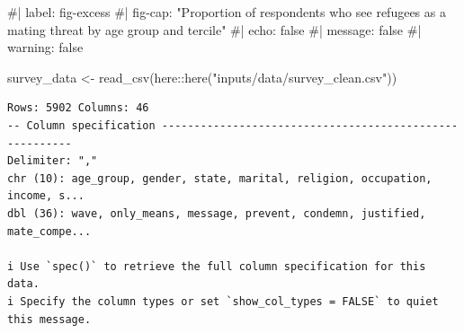 \documentclass[
]{article}
\newenvironment{Shaded}{\begin{snugshade}}{\end{snugshade}}
\newcommand{\CommentTok}[1]{\textcolor[rgb]{0.37,0.37,0.37}{#1}}
\newcommand{\FunctionTok}[1]{\textcolor[rgb]{0.28,0.35,0.67}{#1}}
\newcommand{\NormalTok}[1]{\textcolor[rgb]{0.00,0.23,0.31}{#1}}
\newcommand{\OtherTok}[1]{\textcolor[rgb]{0.00,0.23,0.31}{#1}}
\newcommand{\SpecialCharTok}[1]{\textcolor[rgb]{0.37,0.37,0.37}{#1}}
\newcommand{\StringTok}[1]{\textcolor[rgb]{0.13,0.47,0.30}{#1}}
\begin{document}
\begin{Shaded}
\begin{Highlighting}[]
\CommentTok{\#| label: fig{-}excess}
\CommentTok{\#| fig{-}cap: "Proportion of respondents who see refugees as a mating threat by age group and tercile"}
\CommentTok{\#| echo: false}
\CommentTok{\#| message: false}
\CommentTok{\#| warning: false}

\NormalTok{survey\_data }\OtherTok{\textless{}{-}} \FunctionTok{read\_csv}\NormalTok{(here}\SpecialCharTok{::}\FunctionTok{here}\NormalTok{(}\StringTok{"inputs/data/survey\_clean.csv"}\NormalTok{))}
\end{Highlighting}
\end{Shaded}

\begin{verbatim}
Rows: 5902 Columns: 46
-- Column specification --------------------------------------------------------
Delimiter: ","
chr (10): age_group, gender, state, marital, religion, occupation, income, s...
dbl (36): wave, only_means, message, prevent, condemn, justified, mate_compe...

i Use `spec()` to retrieve the full column specification for this data.
i Specify the column types or set `show_col_types = FALSE` to quiet this message.
\end{verbatim}
\end{document}
